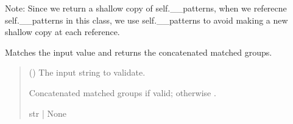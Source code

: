 \documentclass[letterpaper,10pt,english]{sphinxmanual}
\begin{document}
\begin{fulllineitems}
\begin{fulllineitems}
\sphinxAtStartPar
Note:
Since we return a shallow copy of self.\_\_patterns, when we referecne self.\_\_patterns
in this class, we use self.\_\_patterns to avoid making a new shallow copy at each reference.

\end{fulllineitems}


\begin{fulllineitems}
\label{\detokenize{apache_commons_validator_python.routines:id35}}
\pysigstartsignatures
{}
\pysigstopsignatures
\end{fulllineitems}


\begin{fulllineitems}
\label{\detokenize{apache_commons_validator_python.routines:apache_commons_validator_python.routines.regex_validator.RegexValidator.validate}}
\pysigstartsignatures
{}
\pysigstopsignatures
\sphinxAtStartPar
Matches the input value and returns the concatenated matched groups.
\begin{quote}\begin{description}
\sphinxAtStartPar
{} () \textendash{} The input string to validate.

\sphinxAtStartPar
Concatenated matched groups if valid; otherwise .

\sphinxAtStartPar
str | None

\end{description}\end{quote}

\end{fulllineitems}


\end{fulllineitems}
\end{document}
